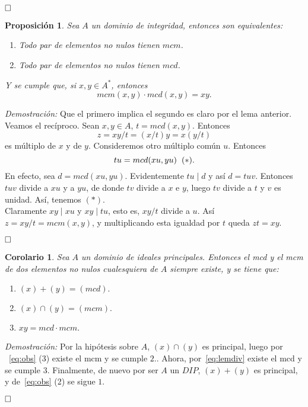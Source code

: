 \documentclass[12pt]{article}
\newtheorem{proposition}[theorem]{Proposición}
\newtheorem{corolario}{Corolario}[theorem]
\begin{document}
$\hfill \square$
\begin{proposition} \label{eq:mcmd} Sea $A$ un dominio de integridad, entonces son equivalentes:
\begin{enumerate}
\item Todo par de elementos no nulos tienen $mcm$.
\item Todo par de elementos no nulos tienen $mcd$.
\end{enumerate}
Y se cumple que, si $x,y \in A^{\ast}$, entonces $$mcm(x,y) \cdot mcd(x,y) = xy.$$
\end{proposition}
\emph{Demostración: } Que el primero implica el segundo es claro por el lema anterior. Veamos el recíproco. Sean $x,y \in A$, $t = mcd(x,y)$. Entonces $$z = xy/t = (x/t)y = x(y/t)$$ es múltiplo de $x$ y de $y$. Consideremos otro múltiplo común $u$. Entonces $$tu = mcd(xu,yu) \hspace{0.2cm} (\ast).$$ En efecto, sea $d = mcd(xu,yu)$. Evidentemente $tu \mid d$ y así $d = tuv$. Entonces $tuv$ divide a $xu$ y a $yu$, de donde $tv$ divide a $x$ e $y$, luego $tv$ divide a $t$ y $v$ es unidad. Así, tenemos $(\ast)$.\vspace{0.2cm}\\
Claramente $xy \mid xu$ y $xy \mid tu$, esto es, $xy / t$ divide a $u$. Así $z = xy/t = mcm(x,y)$, y multiplicando esta igualdad por $t$ queda $zt = xy$.

$\hfill \square$

\begin{corolario} Sea $A$ un dominio de ideales principales. Entonces el mcd y el mcm de dos elementos no nulos cualesquiera de $A$ siempre existe, y se tiene que: \begin{enumerate}
\item $(x) + (y) = (mcd).$
\item $(x) \cap (y) = (mcm).$
\item $xy = mcd \cdot mcm.$
\end{enumerate}
\end{corolario}
\emph{Demostración: }Por la hipótesis sobre $A$, $(x) \cap (y)$ es principal, luego por ~\ref{eq:obs} (3) existe el mcm y se cumple $2.$. Ahora, por~\ref{eq:lemdiv} existe el mcd y se cumple $3.$ Finalmente, de nuevo por ser $A$ un $DIP$, $(x) + (y)$ es principal, y de~\ref{eq:obs} (2) se sigue $1.$

$\hfill \square$
\end{document}
